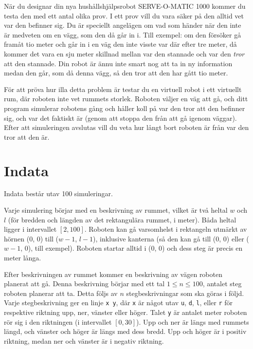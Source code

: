 

När du designar din nya hushållshjälpsrobot SERVE-O-MATIC 1000 kommer du testa
den med ett antal olika prov. I ett prov vill du vara säker på den alltid
vet var den befinner sig. Du är speciellt angelägen om vad som händer när
den inte är medveten om en vägg, som den då går in i. Till exempel: om den
försöker gå framåt tio meter och går in i en väg den inte visste var där efter 
tre meter, då kommer det vara en sju meter skillnad mellan var den stannade
och var den {\em tror} att den stannade. Din robot är ännu inte smart nog
att ta in ny information medan den går, som då denna vägg, så den tror att 
den har gått tio meter.

För att pröva hur illa detta problem är testar du en virtuell robot i ett 
virtuellt rum, där roboten inte vet rummets storlek. Roboten väljer en 
väg att gå, och ditt program simulerar robotens gång och håller koll på var
den tror att den befinner sig, och var det faktiskt är (genom att stoppa den
från att gå igenom väggar). Efter att simuleringen avslutas vill du veta hur
långt bort roboten är från var den tror att den är.

\section*{Indata}

Indata består utav 100 simuleringar.

Varje simulering börjar med en beskrivning av rummet, vilket är två heltal
$w$ och $l$ (för bredden och längden av det rektangulära rummet, i meter).
Båda heltal ligger i intervallet $[2, 100]$.
Roboten kan gå varsomhelst i rektangeln utmärkt av hörnen (0, 0) till
($w-1$, $l-1$), inklusive kanterna (så den kan gå till (0, 0) eller 
($w-1$, 0), till exempel). Roboten startar alltid i (0, 0) och dess steg
är precis en meter långa.

Efter beskrivningen av rummet kommer en beskrivning av vägen roboten
planerat att gå. Denna beskrivning börjar med ett tal $1 \le n \le 100$,
antalet steg roboten planerar att ta. Detta följs av $n$ stegbeskrivningar som
ska göras i följd. Varje stegbeskrivning ger en linje {\tt x y},
där {\tt x} är något utav {\tt u}, {\tt d}, {\tt l}, eller {\tt r} för 
respektive riktning upp, ner, vänster eller höger. Talet {\tt y} är antalet
meter roboten rör sig i den riktningen (i intervallet $[0, 30]$). Upp och
ner är längs med rummets längd, och vänster och höger är längs med dess
bredd. Upp och höger är i positiv riktning, medan ner och vänster är i
negativ riktning.

